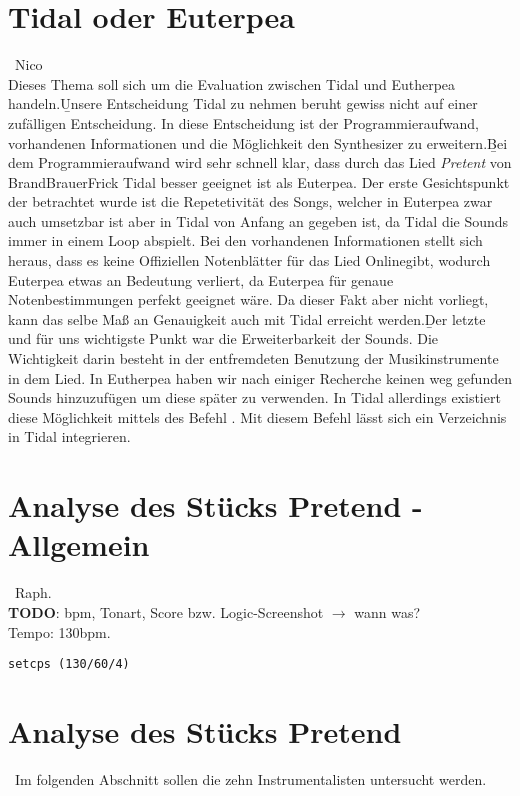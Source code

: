 \documentclass[
10pt, %
a4paper, %
oneside, %
headinclude,footinclude, %
BCOR5mm, %
]{scrartcl}
\begin{document}
\section{Tidal oder Euterpea}\
Nico\\
Dieses Thema soll sich um die Evaluation zwischen Tidal und Eutherpea handeln.\b
Unsere Entscheidung Tidal zu nehmen beruht gewiss nicht auf einer zufälligen Entscheidung. In diese Entscheidung ist der Programmieraufwand, vorhandenen Informationen
und die Möglichkeit den Synthesizer zu erweitern.\b
Bei dem Programmieraufwand wird sehr schnell klar, dass durch das Lied \textit{Pretent} von BrandBrauerFrick Tidal besser geeignet ist als Euterpea. Der erste Gesichtspunkt
der betrachtet wurde ist die Repetetivität des Songs, welcher in Euterpea zwar auch umsetzbar ist aber in Tidal von Anfang an gegeben ist, da Tidal die Sounds immer in einem
Loop abspielt. Bei den vorhandenen Informationen stellt sich heraus, dass es keine Offiziellen Notenblätter für das Lied Onlinegibt, wodurch Euterpea etwas an Bedeutung verliert, da Euterpea für genaue Notenbestimmungen perfekt geeignet wäre. Da dieser Fakt aber nicht vorliegt, kann das selbe Maß an Genauigkeit auch mit Tidal erreicht werden.\b
Der letzte und für uns wichtigste Punkt war die Erweiterbarkeit der Sounds. Die Wichtigkeit darin besteht in der entfremdeten Benutzung der Musikinstrumente in dem Lied.
In Eutherpea haben wir nach einiger Recherche keinen weg gefunden Sounds hinzuzufügen um diese später zu verwenden. In Tidal allerdings existiert diese Möglichkeit mittels
des Befehl \textit{}. Mit diesem Befehl lässt sich ein Verzeichnis in Tidal integrieren.
\section{Analyse des Stücks Pretend - Allgemein}\
Raph.\\
{\color{red}\textbf{TODO}}: bpm, Tonart, Score bzw. Logic-Screenshot $\rightarrow$ wann was?\\

\noindent Tempo: 130bpm.
\begin{lstlisting}
setcps (130/60/4)
\end{lstlisting}


\section{Analyse des Stücks Pretend}\
Im folgenden Abschnitt sollen die zehn Instrumentalisten untersucht werden.
\end{document}
